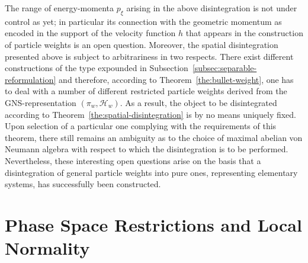 \documentclass[a4paper,a4paper]{article}
\numberwithin{equation}{section}
\newcommand{\Hscr}{\mathscr{H}}
\theoremstyle{definition}
\theoremstyle{plain}
\theoremstyle{remark}
\theoremstyle{assumption}
\begin{document}
  The range of energy-momenta $p_\xi$ arising in the above
  disintegration is not under control as yet; in particular its
  connection with the geometric momentum as encoded in the support of
  the velocity function $h$ that appears in the construction of
  particle weights \cite[Section~3]{porrmann:2002a} is an open
  question. Moreover, the spatial disintegration presented above is
  subject to arbitrariness in two respects. There exist different
  constructions of the type expounded in
  Subsection~\ref{subsec:separable-reformulation} and therefore,
  according to Theorem~\ref{the:bullet-weight}, one has to deal with a
  number of different restricted particle weights derived from the
  GNS-representa\-tion $( \pi_w , \Hscr_w )$. As a result, the object
  to be disintegrated according to
  Theorem~\ref{the:spatial-disintegration} is by no means uniquely
  fixed. Upon selection of a particular one complying with the
  requirements of this theorem, there still remains an ambiguity as to
  the choice of maximal abelian von Neumann algebra with respect to
  which the disintegration is to be performed. Nevertheless, these
  interesting open questions arise on the basis that a disintegration
  of general particle weights into pure ones, representing elementary
  systems, has successfully been constructed.


\section{Phase Space Restrictions and Local Normality}
  \label{sec:local-normality}
  
\end{document}
